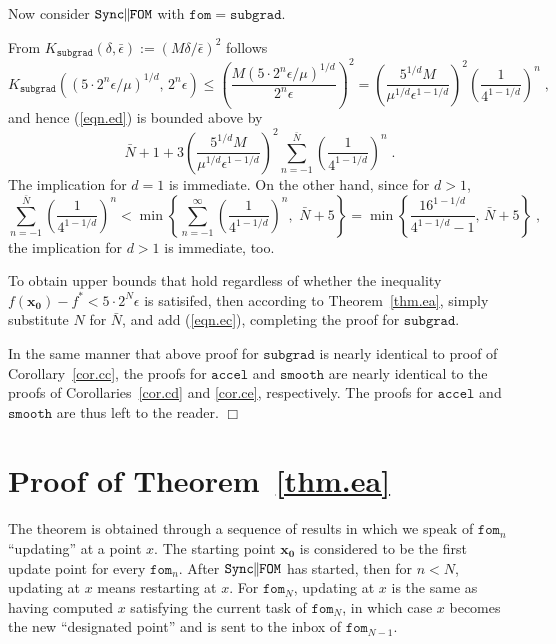\documentclass[reqno, 11pt]{amsart}
\numberwithin{equation}{section}
\newcommand{\nt}{\negthinspace}
\newcommand{\fom}{\mathtt{fom}}
\newcommand{\parfom}{\parallel \nt \nt  \mathtt{FOM}}
\newcommand{\subgrad}{\mathtt{subgrad}}
\newcommand{\accel}{\mathtt{accel}}
\newcommand{\smooth}{\mathtt{smooth}}
\newcommand{\sparfom}{\mathtt{Sync} \nt \nt  \parfom}
\begin{document}
  Now consider $ \sparfom $ with $ \fom = \subgrad $.
  
  From $ K_{\subgrad}(\delta, \bar{\epsilon}  ) :=   (M \delta/ \bar{\epsilon} )^2  $ follows
\[  
    K_{\subgrad} \left( (5 \cdot 2^n \epsilon/\mu)^{1/d}, \, 2^n \epsilon \right)  \leq  \left(  \frac{M (5 \cdot 2^n \epsilon/ \mu )^{1/d}}{2^n \epsilon} \right)^2 = \left( \frac{ 5^{1/d} M }{\mu^{1/d} \epsilon^{1 - 1/d}} \right)^2   \left( \frac{1}{ 4^{1 - 1/d}} \right)^n \; , 
\]
and hence (\ref{eqn.ed})  is bounded above by
\[ 
\bar{N} + 1 + 3 \left( \frac{ 5^{1/d} M }{\mu^{1/d} \epsilon^{1 - 1/d}} \right)^2  \sum_{n=-1}^{\bar{N}} \left( \frac{1}{ 4^{1 - 1/d}} \right)^n \; . 
\] 
The implication for $ d = 1 $  is immediate. On the other hand, since for $ d > 1 $, 
\[  
  \sum_{n=-1}^{\bar{N}} \left( \frac{1}{ 4^{1 - 1/d}} \right)^n < 
 \min \left\{ \sum_{n=-1}^{\infty} \left( \frac{1}{ 4^{1 - 1/d}} \right)^n, \, \, \bar{N} + 5  \right\} 
 =   \min 
  \left\{ \frac{ 16^{1 - 1/d}}{4^{1 - 1/d} - 1}, \, \bar{N} + 5 \right\} \; ,  
\]  
the implication for $ d > 1 $  is immediate, too. 

To obtain upper bounds that hold regardless of whether the inequality $ f( \mathbf{x_0}) - f^* < 5 \cdot 2^N \epsilon $ is satisifed, then according to Theorem~\ref{thm.ea}, simply substitute $ N $ for $ \bar{N} $, and add 
(\ref{eqn.ec}), completing the proof for $ \subgrad $.

In the same manner that above proof for $ \subgrad $  is nearly identical to proof of Corollary~\ref{cor.cc}, the proofs for $ \accel $ and $ \smooth $ are nearly identical to the proofs of Corollaries~\ref{cor.cd}  and \ref{cor.ce}, respectively. The proofs for $ \accel $ and $ \smooth $ are thus left to the reader.  \hfill $ \Box $
 
  


\section{{\bf  Proof of Theorem~\ref{thm.ea}}}  \label{sect.f} 

The theorem is obtained through a sequence of results in which we speak of $ \fom_n $ ``updating'' at a point $ x $. The starting point $ \mathbf{x_0} $ is considered to be the first update point for every $ \fom_n $.  After $ \sparfom $ has started, then for $ n < N $, updating at $ x $ means restarting at $ x $. For $ \fom_{N} $, updating at $ x $ is the same as having computed $ x $ satisfying the current task of $ \fom_{N} $, in which case $ x $ becomes the new ``designated point'' and is sent to the inbox of $ \fom_{N-1} $.
\end{document}
